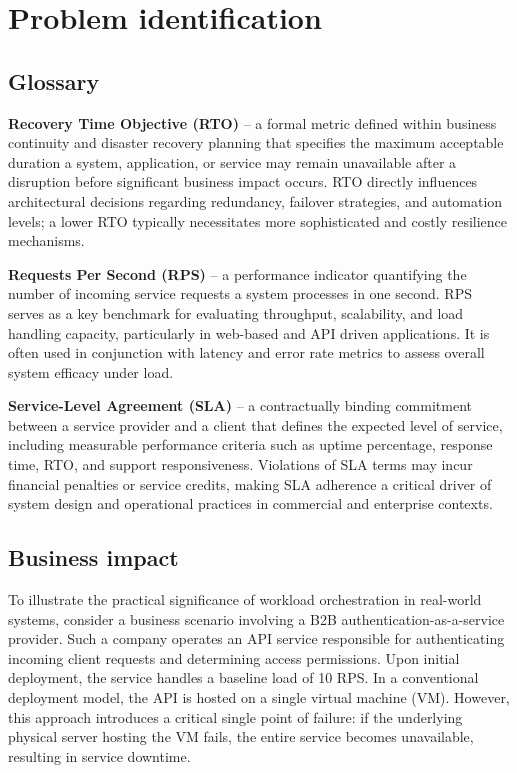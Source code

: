 \chapter{Problem identification}
\label{chap:met}

\section{Glossary}

\textbf{Recovery Time Objective (RTO)} – a formal metric defined within business continuity and disaster recovery planning that specifies the maximum acceptable duration a system, application, or service may remain unavailable after a disruption before significant business impact occurs. RTO directly influences architectural decisions regarding redundancy, failover strategies, and automation levels; a lower RTO typically necessitates more sophisticated and costly resilience mechanisms.

\textbf{Requests Per Second (RPS)} – a performance indicator quantifying the number of incoming service requests a system processes in one second. RPS serves as a key benchmark for evaluating throughput, scalability, and load handling capacity, particularly in web-based and API driven applications. It is often used in conjunction with latency and error rate metrics to assess overall system efficacy under load.

\textbf{Service-Level Agreement (SLA)} – a contractually binding commitment between a service provider and a client that defines the expected level of service, including measurable performance criteria such as uptime percentage, response time, RTO, and support responsiveness. Violations of SLA terms may incur financial penalties or service credits, making SLA adherence a critical driver of system design and operational practices in commercial and enterprise contexts.

\section{Business impact}

To illustrate the practical significance of workload orchestration in real-world systems, consider a business scenario involving a B2B authentication-as-a-service provider. Such a company operates an API service responsible for authenticating incoming client requests and determining access permissions. Upon initial deployment, the service handles a baseline load of 10 RPS. In a conventional deployment model, the API is hosted on a single virtual machine (VM). However, this approach introduces a critical single point of failure: if the underlying physical server hosting the VM fails, the entire service becomes unavailable, resulting in service downtime.

